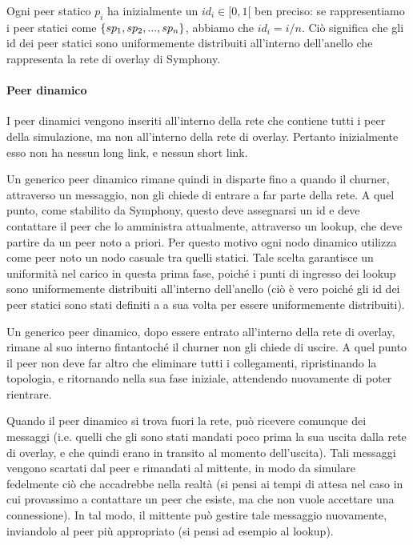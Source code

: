 \documentclass[prodmode,acmtap]{acmlarge}
\begin{document}
Ogni peer statico $p_i$ ha inizialmente un $id_i \in [0,1[$ ben preciso: se rappresentiamo i peer statici come $\{sp_1, \linebreak[1] sp_2, \linebreak[1] ..., \linebreak[1] sp_n\}$, abbiamo che $id_i = i / n$. Ciò significa che gli id dei peer statici sono uniformemente distribuiti all'interno dell'anello che rappresenta la rete di overlay di Symphony.

\paragraph{Peer dinamico}
I peer dinamici vengono inseriti all'interno della rete che contiene tutti i peer della simulazione, ma non all'interno della rete di overlay. Pertanto inizialmente esso non ha nessun long link, e nessun short link. 

Un generico peer dinamico rimane quindi in disparte fino a quando il churner, attraverso un messaggio, non gli chiede di entrare a far parte della rete. A quel punto, come stabilito da Symphony, questo deve assegnarsi un id e deve contattare il peer che lo amministra attualmente, attraverso un lookup, che deve partire da un peer noto  a priori. Per questo motivo ogni nodo dinamico utilizza come peer noto un nodo casuale tra quelli statici. Tale scelta garantisce un uniformità nel carico in questa prima fase, poiché i punti di ingresso dei lookup sono uniformemente distribuiti all'interno dell'anello (ciò è vero poiché gli id dei peer statici sono stati definiti a a sua volta per essere uniformemente distribuiti).

Un generico peer dinamico, dopo essere entrato all'interno della rete di overlay, rimane al suo interno fintantoché il churner non gli chiede di uscire. A quel punto il peer non deve far altro che eliminare tutti i collegamenti, ripristinando la topologia, e ritornando nella sua fase iniziale, attendendo nuovamente di poter rientrare. 

Quando il peer dinamico si trova fuori la rete, può ricevere comunque dei messaggi (i.e. quelli che gli sono stati mandati poco prima la sua uscita dalla rete di overlay, e che quindi erano in transito al momento dell'uscita). Tali messaggi vengono scartati dal peer e rimandati al mittente, in modo da simulare fedelmente ciò che accadrebbe nella realtà (si pensi ai tempi di attesa nel caso in cui provassimo a contattare un peer che esiste, ma che non vuole accettare una connessione). In tal modo, il mittente può gestire tale messaggio nuovamente, inviandolo al peer più appropriato (si pensi ad esempio al lookup).
\end{document}
